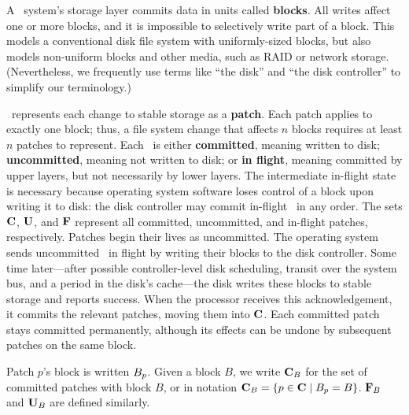 A \Kudos\ system's storage layer commits data in units called
 \textbf{blocks}.
%
All writes affect one or more blocks, and it is impossible to selectively
 write part of a block.
%
This models a conventional disk file system with uniformly-sized blocks,
 but also models non-uniform blocks and other media, such as RAID or
 network storage.
%
(Nevertheless, we frequently use terms like ``the disk'' and ``the disk
 controller'' to simplify our terminology.)

\Kudos\ represents each change to stable storage as a \textbf{patch}.
%
Each patch applies to exactly one block; thus, a file system change that
 affects $n$ blocks requires at least $n$ patches to represent.
%
Each \patch\ is either
 \textbf{committed}, meaning written to disk;
 \textbf{uncommitted}, meaning not written to disk;
 or \textbf{in flight}, meaning committed by upper layers, but not
 necessarily by lower layers.
%
The intermediate in-flight state is necessary because
 operating system software loses control of a block upon writing it
 to disk: the disk controller may commit in-flight \patches\ in any order.
%
The sets $\PDisk$, $\PMem$, and $\PInf$ represent all committed,
 uncommitted, and in-flight patches, respectively.
%
Patches begin their lives as uncommitted.
%
The operating system sends uncommitted \patches\ in flight
 by writing their blocks to the disk controller.  Some
 time later---after possible controller-level disk scheduling, transit over
 the system bus, and a period in the disk's cache---the disk writes these blocks
 to stable storage and reports success.  When the processor receives this
 acknowledgement, it commits the relevant patches, moving them into $\PDisk$.
%
Each committed patch stays committed permanently, although its effects can
 be undone by subsequent patches on the same block.
%
%

Patch $p$'s block is written $B_{p}$.
%
Given a block $B$, we write $\PDisk[B]$ for the set of committed
 patches with block $B$, or in notation $\PDisk[B] = \{p\in\PDisk\mid\PBlock{p}=B\}$.
%
$\PInf[B]$ and $\PMem[B]$ are defined similarly.


